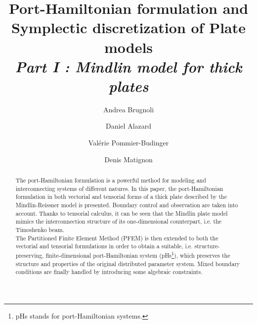 \documentclass[preprint,12pt]{elsarticle}
\begin{document}
	
	\begin{frontmatter}	
		
		\title{Port-Hamiltonian formulation and \\ Symplectic discretization of Plate models \\
		\vspace{2mm}\large\textit{Part I : Mindlin model for thick plates}}	
		\author[ISAE]{Andrea Brugnoli}
		
		\author[ISAE]{Daniel Alazard}
		
		\author[ISAE]{Valérie Pommier-Budinger}
		
		\author[ISAE]{Denis Matignon}
		
		
		
		\address[ISAE]{ISAE-SUPAERO, Université de Toulouse, France.\\
		\vspace{2mm} {10 Avenue Edouard Belin, BP-54032, 31055 Toulouse Cedex 4.}}
		
		\begin{abstract}
		The port-Hamiltonian formulation is a powerful method  for modeling and interconnecting systems of different natures. In this paper, the port-Hamiltonian formulation in both vectorial and tensorial forms of a thick plate described  by the Mindlin-Reissner model is presented. Boundary control and observation are taken into account. Thanks to tensorial calculus, it can be seen that the Mindlin plate model mimics the interconnection structure of its one-dimensional counterpart, i.e. the Timoshenko beam.\\
        The Partitioned Finite Element Method (PFEM) is then extended to both the vectorial and tensorial formulations in order to obtain a suitable, i.e. structure-preserving, finite-dimensional port-Hamiltonian system (pHs\footnote{pHs stands for port-Hamiltonian systems.}), which preserves the structure and properties of the original distributed parameter system. Mixed boundary conditions are finally handled by introducing some algebraic constraints.
		\end{abstract}
		

\end{frontmatter}
\end{document}
